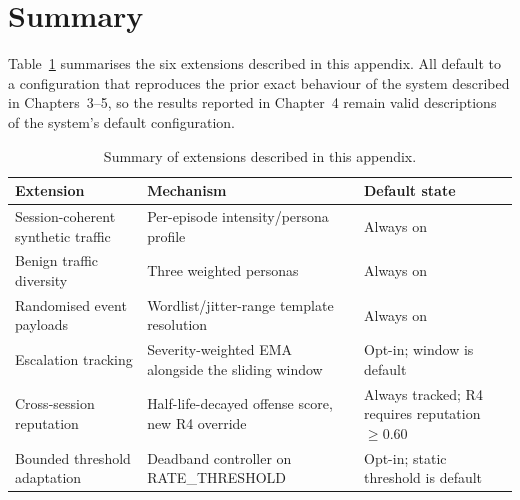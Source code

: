 \section{Summary}

Table~\ref{tab:extensions_summary} summarises the six extensions
described in this appendix. All default to a configuration that
reproduces the prior exact behaviour of the system described in
Chapters~3--5, so the results reported in Chapter~4 remain valid
descriptions of the system's default configuration.

\begin{table}[ht]
  \centering
  \caption{Summary of extensions described in this appendix.}
  \label{tab:extensions_summary}
  \begin{tabular}{p{3.6cm}p{5.2cm}p{3.8cm}}
    \toprule
    Extension & Mechanism & Default state \\
    \midrule
    Session-coherent synthetic traffic & Per-episode intensity/persona profile & Always on \\
    Benign traffic diversity & Three weighted personas & Always on \\
    Randomised event payloads & Wordlist/jitter-range template resolution & Always on \\
    Escalation tracking & Severity-weighted EMA alongside the sliding window & Opt-in; window is default \\
    Cross-session reputation & Half-life-decayed offense score, new R4 override & Always tracked; R4 requires reputation $\geq 0.60$ \\
    Bounded threshold adaptation & Deadband controller on RATE\_THRESHOLD & Opt-in; static threshold is default \\
    \bottomrule
  \end{tabular}
\end{table}
